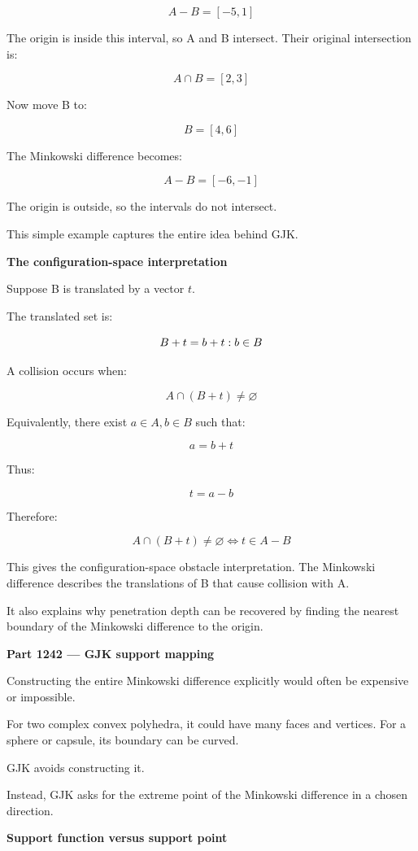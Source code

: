 \[
A-B=[-5,1]
\]

The origin is inside this interval, so A and B intersect. Their original intersection is:

\[
A\cap B=[2,3]
\]

Now move B to:

\[
B=[4,6]
\]

The Minkowski difference becomes:

\[
A-B=[-6,-1]
\]

The origin is outside, so the intervals do not intersect.

This simple example captures the entire idea behind GJK.

\textbf{The configuration-space interpretation}

Suppose B is translated by a vector \(t\).

The translated set is:

\[
B+t=\\{b+t:b\in B\\}
\]

A collision occurs when:

\[
A\cap(B+t)\ne\varnothing
\]

Equivalently, there exist \(a\in A,b\in B\) such that:

\[
a=b+t
\]

Thus:

\[
t=a-b
\]

Therefore:

\[
\boxed{ A\cap(B+t)\ne\varnothing \iff t\in A-B }
\]

This gives the configuration-space obstacle interpretation. The Minkowski difference describes the translations of B that cause collision with A.

It also explains why penetration depth can be recovered by finding the nearest boundary of the Minkowski difference to the origin.

\textbf{Part 1242 --- GJK support mapping}

Constructing the entire Minkowski difference explicitly would often be expensive or impossible.

For two complex convex polyhedra, it could have many faces and vertices. For a sphere or capsule, its boundary can be curved.

GJK avoids constructing it.

Instead, GJK asks for the extreme point of the Minkowski difference in a chosen direction.

\textbf{Support function versus support point}

